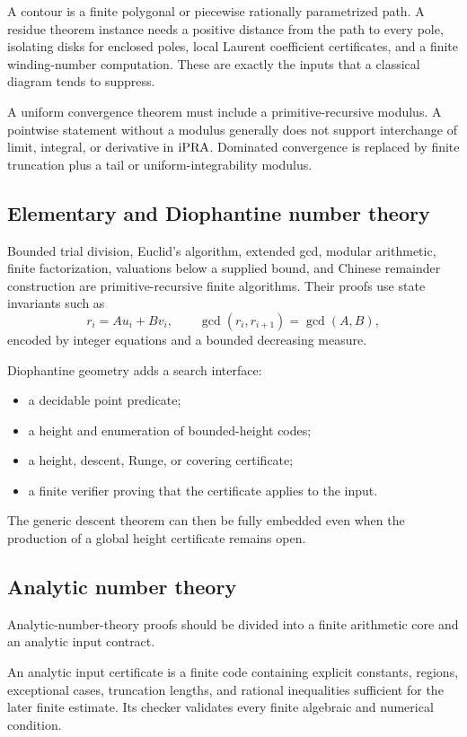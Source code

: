A contour is a finite polygonal or piecewise rationally parametrized path.  A
residue theorem instance needs a positive distance from the path to every
pole, isolating disks for enclosed poles, local Laurent coefficient
certificates, and a finite winding-number computation.  These are exactly the
inputs that a classical diagram tends to suppress.

A uniform convergence theorem must include a primitive-recursive modulus.  A
pointwise statement without a modulus generally does not support interchange
of limit, integral, or derivative in \(\mathrm{iPRA}\).  Dominated convergence is
replaced by finite truncation plus a tail or uniform-integrability modulus.

\subsection{Elementary and Diophantine number theory}

Bounded trial division, Euclid's algorithm, extended gcd, modular arithmetic,
finite factorization, valuations below a supplied bound, and Chinese remainder
construction are primitive-recursive finite algorithms.  Their proofs use
state invariants such as
\[
 r_i=A u_i+B v_i,
 \qquad
 \gcd(r_i,r_{i+1})=\gcd(A,B),
\]
encoded by integer equations and a bounded decreasing measure.

Diophantine geometry adds a search interface:
\begin{itemize}
\item a decidable point predicate;
\item a height and enumeration of bounded-height codes;
\item a height, descent, Runge, or covering certificate;
\item a finite verifier proving that the certificate applies to the input.
\end{itemize}
The generic descent theorem can then be fully embedded even when the production
of a global height certificate remains open.

\subsection{Analytic number theory}

Analytic-number-theory proofs should be divided into a finite arithmetic core
and an analytic input contract.

\begin{definition}
An analytic input certificate is a finite code containing explicit constants,
regions, exceptional cases, truncation lengths, and rational inequalities
sufficient for the later finite estimate.  Its checker validates every finite
algebraic and numerical condition.
\end{definition}

